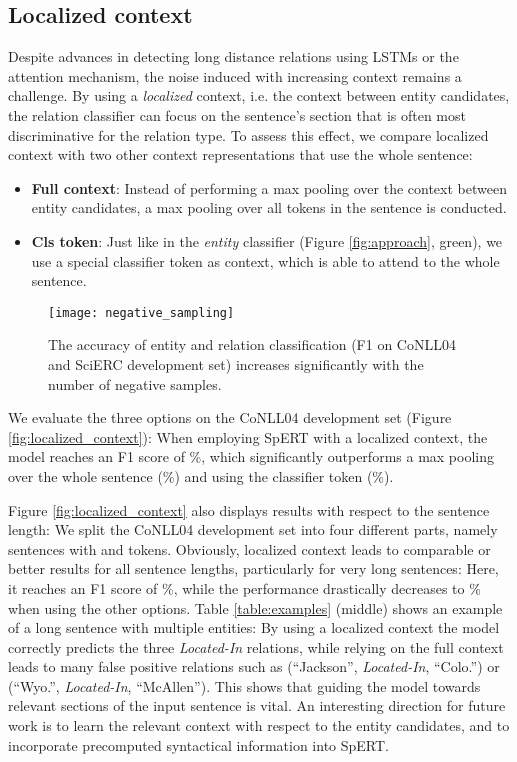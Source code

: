 \documentclass{ecai}
\begin{document}
\subsection{Localized context}

Despite advances in detecting long distance relations using LSTMs or the attention mechanism, the noise induced with increasing context remains a challenge. By using a {\it localized} context, i.e. the context between entity candidates, the relation classifier can focus on the sentence's section that is often most discriminative for the relation type. To assess this effect, we compare localized context with two other context representations that use the whole sentence:

\begin{itemize}
    \item \textbf{Full context}: Instead of performing a max pooling over the context between entity candidates, a max pooling over all tokens in the sentence is conducted.
    \item \textbf{Cls token}: Just like in the {\it entity} classifier (Figure \ref{fig:approach}, green), we use a special classifier token as context, which is able to attend to the whole sentence.
\end{itemize}

\begin{figure}[ht!]
    \centering
    \texttt{[image: negative\_sampling]}
    \caption{The accuracy of entity and relation classification (F1 on CoNLL04 and SciERC development set) increases significantly with the number of negative samples.}
    \label{fig:neg_sampling}
\end{figure}

We evaluate the three options on the CoNLL04 development set (Figure \ref{fig:localized_context}): When employing SpERT with a localized context, the model reaches an F1 score of \%, which significantly outperforms a max pooling over the whole sentence (\%) and using the classifier token (\%).

Figure \ref{fig:localized_context} also displays results with respect to the sentence length: We split the CoNLL04 development set into four different parts, namely sentences with  and  tokens. Obviously, localized context leads to comparable or better results for all sentence lengths, particularly for very long sentences: Here, it reaches an F1 score of \%, while the performance drastically decreases to \% when using the other options. Table \ref{table:examples} (middle) shows an example of a long sentence with multiple entities: By using a localized context the model correctly predicts the three \emph{Located-In} relations, while relying on the full context leads to many false positive relations such as (\enquote{Jackson}, \emph{Located-In}, \enquote{Colo.}) or (\enquote{Wyo.}, \emph{Located-In}, \enquote{McAllen}).
This shows that guiding the model towards relevant sections of the input sentence is vital. An interesting direction for future work is to learn the relevant context with respect to the entity candidates, and to incorporate precomputed syntactical information into SpERT.
\end{document}
